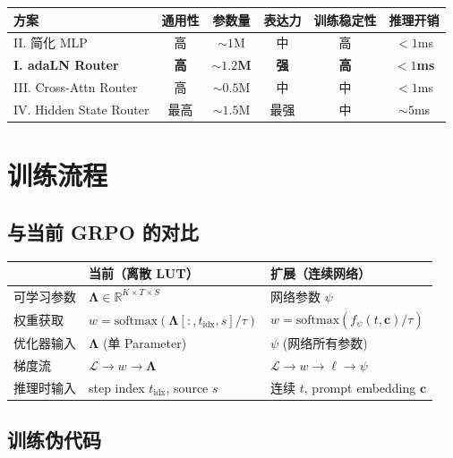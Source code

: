\documentclass[11pt,a4paper]{article}
\newcommand{\loss}{\mathcal{L}}
\newcommand{\R}{\mathbb{R}}
\newcommand{\softmax}{\mathrm{softmax}}
\theoremstyle{definition}
\begin{document}
\begin{center}
\small
\begin{tabular}{lccccc}
\toprule
\textbf{方案} & \textbf{通用性} & \textbf{参数量} & \textbf{表达力} & \textbf{训练稳定性} & \textbf{推理开销} \\
\midrule
II. 简化 MLP & 高 & $\sim 1$M & 中 & 高 & $< 1$ms \\
\textbf{I. adaLN Router} & \textbf{高} & $\sim 1.2$\textbf{M} & \textbf{强} & \textbf{高} & $< 1$\textbf{ms} \\
III. Cross-Attn Router & 高 & $\sim 0.5$M & 中 & 中 & $< 1$ms \\
IV. Hidden State Router & 最高 & $\sim 1.5$M & 最强 & 中 & $\sim 5$ms \\
\bottomrule
\end{tabular}
\end{center}

\section{训练流程}

\subsection{与当前 GRPO 的对比}

\begin{center}
\begin{tabular}{lll}
\toprule
& \textbf{当前（离散 LUT）} & \textbf{扩展（连续网络）} \\
\midrule
可学习参数 & $\bm{\Lambda} \in \R^{K \times T \times S}$ & 网络参数 $\psi$ \\
权重获取 & $w = \softmax(\bm{\Lambda}[:, t_{\text{idx}}, s] / \tau)$ & $w = \softmax(f_\psi(t, \mathbf{c}) / \tau)$ \\
优化器输入 & $\bm{\Lambda}$ (单 Parameter) & $\psi$ (网络所有参数) \\
梯度流 & $\loss \to w \to \bm{\Lambda}$ & $\loss \to w \to \ell \to \psi$ \\
推理时输入 & step index $t_{\text{idx}}$, source $s$ & 连续 $t$, prompt embedding $\mathbf{c}$ \\
\bottomrule
\end{tabular}
\end{center}

\subsection{训练伪代码}
\end{document}
